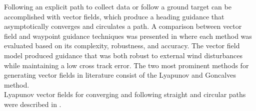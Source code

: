 \documentclass[conf]{new-aiaa}
\begin{document}
	

Following an explicit path to collect data or follow a ground target can be accomplished with vector fields, which produce a heading guidance that asymptotically converges and circulates a path. A comparison between vector field and waypoint guidance techniques was presented in \cite{sujit_unmanned_2014} where each method was evaluated based on its complexity, robustness, and accuracy. The vector field model produced guidance that was both robust to external wind disturbances while maintaining a low cross track error. The two most prominent methods for generating vector fields in literature consist of the Lyapunov \cite{nelson_cooperative_2005,nelson_vector_2006,nelson_vector_2007,frew_cooperative_2007,miao_orthogonal_2016,griffiths_vector_2006} and Goncalves \cite{goncalves_artificial_2009,goncalves_circulation_2010,goncalves_vector_2010,gerlach_autonomous_2014} method. \\

Lyapunov vector fields for converging and following straight and circular paths were described in \cite{nelson_cooperative_2005}. 
\end{document}
